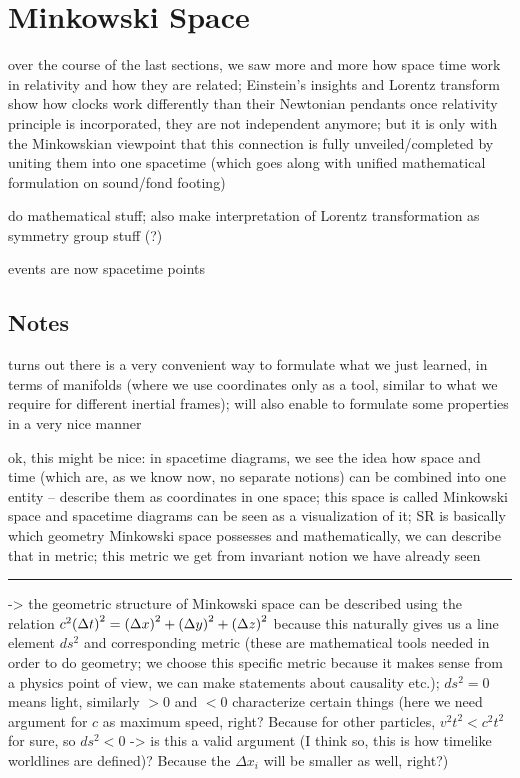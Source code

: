 	\section{Minkowski Space}
over the course of the last sections, we saw more and more how space time work in relativity and how they are related; Einstein's insights and Lorentz transform show how clocks work differently than their Newtonian pendants once relativity principle is incorporated, they are not independent anymore; but it is only with the Minkowskian viewpoint that this connection is fully unveiled/completed by uniting them into one spacetime (which goes along with unified mathematical formulation on sound/fond footing)


do mathematical stuff; also make interpretation of Lorentz transformation as symmetry group stuff (?)

events are now spacetime points




		\subsection{Notes}

turns out there is a very convenient way to formulate what we just learned, in terms of manifolds (where we use coordinates only as a tool, similar to what we require for different inertial frames); will also enable to formulate some properties in a very nice manner

ok, this might be nice: in spacetime diagrams, we see the idea how space and time (which are, as we know now, no separate notions) can be combined into one entity -- describe them as coordinates in one space; this space is called Minkowski space and spacetime diagrams can be seen as a visualization of it; SR is basically which geometry Minkowski space possesses and mathematically, we can describe that in metric; this metric we get from invariant notion we have already seen

\hrule

-> the geometric structure of Minkowski space can be described using the relation $c^2 \qty(\Delta t)^2 = \qty(\Delta x)^2 + \qty(\Delta y)^2 + \qty(\Delta z)^2$ because this naturally gives us a line element $ds^2$ and corresponding metric (these are mathematical tools needed in order to do geometry; we choose this specific metric because it makes sense from a physics point of view, we can make statements about causality etc.); $ds^2 = 0$ means light, similarly $> 0$ and $< 0$ characterize certain things (here we need argument for $c$ as maximum speed, right? Because for other particles, $v^2 t^2 < c^2 t^2$ for sure, so $ds^2 < 0$ -> is this a valid argument (I think so, this is how timelike worldlines are defined)? Because the $\Delta x_i$ will be smaller as well, right?)

